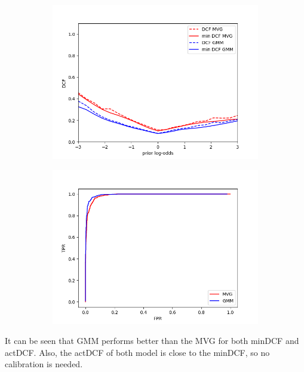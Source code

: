 \documentclass[english]{report}
\begin{document}
\begin{figure}[h!]
    \begin{subfigure}{0.5\textwidth}
        \includegraphics[scale=0.5]{../../images/comparison/validation/DCF_MVG&GMM}
    \end{subfigure}
    \begin{subfigure}{0.5\textwidth}
        \includegraphics[scale=0.5]{../../images/comparison/validation/ROC_MVG&GMM}
    \end{subfigure}
    \label{fig:MVGvsGMM}
\end{figure}
It can be seen that GMM performs better than the MVG for both minDCF and actDCF.
Also, the actDCF of both model is close to the minDCF, so no calibration is needed.
\end{document}
